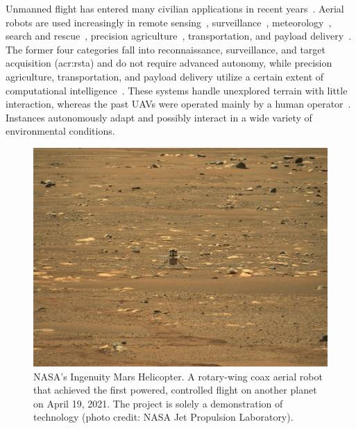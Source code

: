 Unmanned flight has entered many civilian applications in recent years~\citep{gonzalez2017unmanned}. Aerial robots are used increasingly in remote sensing~\citep{colomina2014unmanned,noor2018remote,tang2015drone,milas2018drones}, surveillance~\citep{acevedo2014one,ramasamy2017heuristic,basilico2015deploying,paucar2018use,burkle2009collaborating}, meteorology~\citep{renzaglia2016monitoring,schuyler2019using}, search and rescue~\citep{hayat2017multi,pensieri2020drones,karaca2018potential,cui2015drones,seguin2018unmanned}, precision agriculture~\citep{popovic2017online,sa2018weednet,lottes2017uav,daponte2019review,puri2017agriculture}, transportation, and payload delivery~\citep{kellermann2020drones}. The former four categories fall into reconnaissance, surveillance, and target acquisition (\Gls{acr:rsta}) and do not require advanced autonomy, while precision agriculture, transportation, and payload delivery utilize a certain extent of computational intelligence~\citep{siciliano2016springer}. These systems handle unexplored terrain with little interaction, whereas the past UAVs were operated mainly by a human operator~\citep{siciliano2016springer}. Instances autonomously adapt and possibly interact in a wide variety of environmental conditions.

\begin{figure}[t]
  \sfr
  \centering
  \includegraphics[width=.7\textwidth]{pictures/jpegPIA24550}
  \caption[NASA's Ingenuity Mars Helicopter]{NASA's Ingenuity Mars Helicopter. A rotary-wing coax aerial robot that achieved the first powered, controlled flight on another planet on April 19, 2021. The project is solely a demonstration of technology {\scriptsize(photo credit: NASA Jet Propulsion Laboratory)}.}   
  \label{fig:ingenuity}
  \efr
\end{figure}

